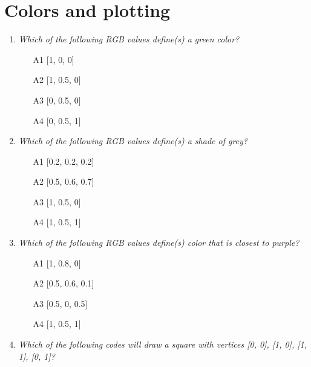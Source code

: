 
\section{Colors and plotting}

\begin{enumerate}

\item {\em Which of the following RGB values define(s) a green color?}\\

\begin{enumerate}
\item[A1] [1, 0, 0]
\item[A2] [1, 0.5, 0]
\item[A3] [0, 0.5, 0]
\item[A4] [0, 0.5, 1]
\end{enumerate}

\vspace{6mm}

\item {\em Which of the following RGB values define(s) a shade of grey?}\\

\begin{enumerate}
\item[A1] [0.2, 0.2, 0.2]
\item[A2] [0.5, 0.6, 0.7]
\item[A3] [1, 0.5, 0]
\item[A4] [1, 0.5, 1]
\end{enumerate}

\vspace{6mm}

\item {\em Which of the following RGB values define(s) color that is closest to purple?}\\

\begin{enumerate}
\item[A1] [1, 0.8, 0]
\item[A2] [0.5, 0.6, 0.1]
\item[A3] [0.5, 0, 0.5]
\item[A4] [1, 0.5, 1]
\end{enumerate}

\vspace{6mm}

\item {\em Which of the following codes will draw a square with vertices 
[0, 0], [1, 0], [1, 1], [0, 1]?}\\


\end{enumerate}
